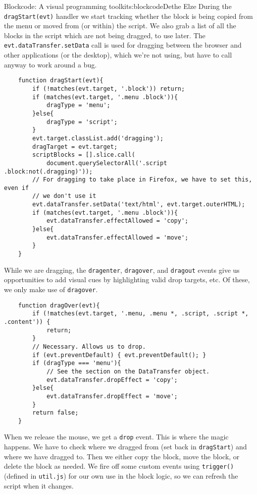\begin{aosachapter}{Blockcode: A visual programming toolkit}{s:blockcode}{Dethe Elze}
During the \texttt{dragStart(evt)} handler we start tracking whether the
block is being copied from the menu or moved from (or within) the
script. We also grab a list of all the blocks in the script which are
not being dragged, to use later. The \texttt{evt.dataTransfer.setData}
call is used for dragging between the browser and other applications (or
the desktop), which we're not using, but have to call anyway to work
around a bug.

\begin{verbatim}
    function dragStart(evt){
        if (!matches(evt.target, '.block')) return;
        if (matches(evt.target, '.menu .block')){
            dragType = 'menu';
        }else{
            dragType = 'script';
        }
        evt.target.classList.add('dragging');
        dragTarget = evt.target;
        scriptBlocks = [].slice.call(
            document.querySelectorAll('.script .block:not(.dragging)'));
        // For dragging to take place in Firefox, we have to set this, even if
        // we don't use it
        evt.dataTransfer.setData('text/html', evt.target.outerHTML);
        if (matches(evt.target, '.menu .block')){
            evt.dataTransfer.effectAllowed = 'copy';
        }else{
            evt.dataTransfer.effectAllowed = 'move';
        }
    }
\end{verbatim}

While we are dragging, the \texttt{dragenter}, \texttt{dragover}, and
\texttt{dragout} events give us opportunities to add visual cues by
highlighting valid drop targets, etc. Of these, we only make use of
\texttt{dragover}.

\begin{verbatim}
    function dragOver(evt){
        if (!matches(evt.target, '.menu, .menu *, .script, .script *, .content')) {
            return;
        }
        // Necessary. Allows us to drop.
        if (evt.preventDefault) { evt.preventDefault(); } 
        if (dragType === 'menu'){
            // See the section on the DataTransfer object.
            evt.dataTransfer.dropEffect = 'copy';  
        }else{
            evt.dataTransfer.dropEffect = 'move';
        }
        return false;
    }
\end{verbatim}

When we release the mouse, we get a \texttt{drop} event. This is where
the magic happens. We have to check where we dragged from (set back in
\texttt{dragStart}) and where we have dragged to. Then we either copy
the block, move the block, or delete the block as needed. We fire off
some custom events using \texttt{trigger()} (defined in
\texttt{util.js}) for our own use in the block logic, so we can refresh
the script when it changes.


\end{aosachapter}
